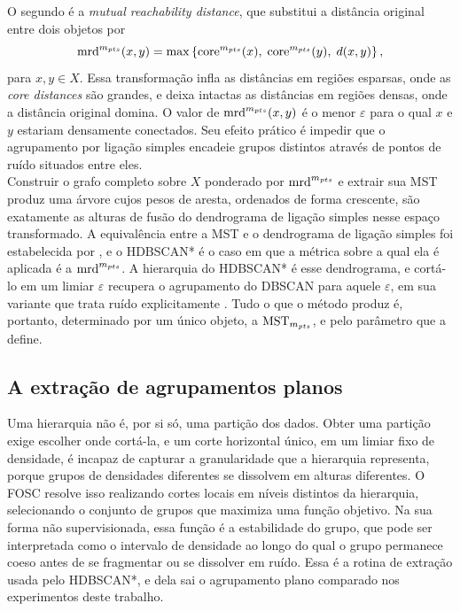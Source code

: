 O segundo é a \textit{mutual reachability distance}, que substitui a distância original entre dois objetos por
\begin{equation}
\label{eq:mrd}
\mathrm{mrd}^{m_{pts}}(x,y) = \max \left\{ \mathrm{core}^{m_{pts}}(x),\; \mathrm{core}^{m_{pts}}(y),\; d(x,y) \right\},
\end{equation}
para $x, y \in X$. Essa transformação infla as distâncias em regiões esparsas, onde as \textit{core distances} são grandes, e deixa intactas as distâncias em regiões densas, onde a distância original domina. O valor de $\mathrm{mrd}^{m_{pts}}(x,y)$ é o menor $\varepsilon$ para o qual $x$ e $y$ estariam densamente conectados. Seu efeito prático é impedir que o agrupamento por ligação simples encadeie grupos distintos através de pontos de ruído situados entre eles.\\

Construir o grafo completo sobre $X$ ponderado por $\mathrm{mrd}^{m_{pts}}$ e extrair sua \ac{MST} produz uma árvore cujos pesos de aresta, ordenados de forma crescente, são exatamente as alturas de fusão do dendrograma de ligação simples nesse espaço transformado. A equivalência entre a \ac{MST} e o dendrograma de ligação simples foi estabelecida por , e o \ac{HDBSCAN*} é o caso em que a métrica sobre a qual ela é aplicada é a $\mathrm{mrd}^{m_{pts}}$. A hierarquia do \ac{HDBSCAN*} é esse dendrograma, e cortá-lo em um limiar $\varepsilon$ recupera o agrupamento do \ac{DBSCAN} para aquele $\varepsilon$, em sua variante que trata ruído explicitamente \cite{hdbscan}. Tudo o que o método produz é, portanto, determinado por um único objeto, a $\mathrm{MST}_{m_{pts}}$, e pelo parâmetro que a define.\\

\subsection{A extração de agrupamentos planos\label{sec:fosc}}

Uma hierarquia não é, por si só, uma partição dos dados. Obter uma partição exige escolher onde cortá-la, e um corte horizontal único, em um limiar fixo de densidade, é incapaz de capturar a granularidade que a hierarquia representa, porque grupos de densidades diferentes se dissolvem em alturas diferentes. O \ac{FOSC} \cite{fosc} resolve isso realizando cortes locais em níveis distintos da hierarquia, selecionando o conjunto de grupos que maximiza uma função objetivo. Na sua forma não supervisionada, essa função é a estabilidade do grupo, que pode ser interpretada como o intervalo de densidade ao longo do qual o grupo permanece coeso antes de se fragmentar ou se dissolver em ruído. Essa é a rotina de extração usada pelo \ac{HDBSCAN*}, e dela sai o agrupamento plano comparado nos experimentos deste trabalho.\\

